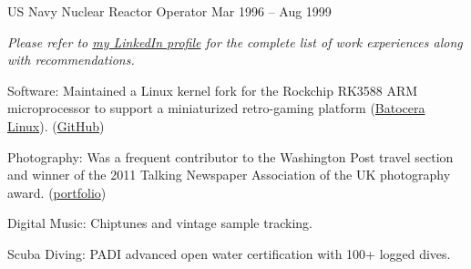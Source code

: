 \documentclass[10pt,a4paper]{article}
\begin{document}
    
    \headedsection 
    {US Navy}
    {}
    {
        \headedsubsection
        {Nuclear Reactor Operator}
        {Mar 1996 -- Aug 1999}
        {}    
    }
    
    
    \begin{center}
        \textit{Please refer to \href{https://www.linkedin.com/in/steve-hay-8763636b}{my LinkedIn profile} for the complete list of work experiences along with recommendations.}
    \end{center}
    
    
    \spacedhrule{-0.2em}{-0.4em}


    
    \inlineheadsection
    {Software:}
    {Maintained a Linux kernel fork for the Rockchip RK3588 ARM microprocessor to support a miniaturized retro-gaming platform (\href{https://batocera.org}{Batocera Linux}). (\href{https://github.com/stvhay/kernel}{GitHub})}
    
    
    \inlineheadsection
    {Photography:}
    {Was a frequent contributor to the Washington Post travel section and winner of the 2011 Talking Newspaper Association of the UK photography award. (\href{https://www.flickr.com/photos/stevehay/albums}{portfolio})}


    \inlineheadsection
    {Digital Music:}
    {Chiptunes and vintage sample tracking.}
    
    
    \inlineheadsection
    {Scuba Diving:}
    {PADI advanced open water certification with 100+ logged dives.}
    
\end{document}
